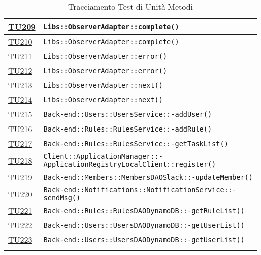 \begin{longtable}{|>{\centering}m{1cm}|m{12cm}<{\centering}|}
\hyperlink{TU209}{TU209} & \texttt{Libs::ObserverAdapter::complete()}\\ \hline

\hyperlink{TU210}{TU210} & \texttt{Libs::ObserverAdapter::complete()}\\ \hline

\hyperlink{TU211}{TU211} & \texttt{Libs::ObserverAdapter::error()}\\ \hline

\hyperlink{TU212}{TU212} & \texttt{Libs::ObserverAdapter::error()}\\ \hline

\hyperlink{TU213}{TU213} & \texttt{Libs::ObserverAdapter::next()}\\ \hline

\hyperlink{TU214}{TU214} & \texttt{Libs::ObserverAdapter::next()}\\ \hline

\hyperlink{TU215}{TU215} & \texttt{Back-end::Users::UsersService::-\linebreak addUser()}\\ \hline

\hyperlink{TU216}{TU216} & \texttt{Back-end::Rules::RulesService::-\linebreak addRule()}\\ \hline

\hyperlink{TU217}{TU217} & \texttt{Back-end::Rules::RulesService::-\linebreak getTaskList()}\\ \hline

\hyperlink{TU218}{TU218} & \texttt{Client::ApplicationManager::-\linebreak ApplicationRegistryLocalClient::register()}\\ \hline

\hyperlink{TU219}{TU219} & \texttt{Back-end::Members::MembersDAOSlack::-\linebreak updateMember()}\\ \hline

\hyperlink{TU220}{TU220} & \texttt{Back-end::Notifications::NotificationService::-\linebreak sendMsg()}\\ \hline

\hyperlink{TU221}{TU221} & \texttt{Back-end::Rules::RulesDAODynamoDB::-\linebreak getRuleList()}\\ \hline

\hyperlink{TU222}{TU222} & \texttt{Back-end::Users::UsersDAODynamoDB::-\linebreak getUserList()}\\ \hline

\hyperlink{TU223}{TU223} & \texttt{Back-end::Users::UsersDAODynamoDB::-\linebreak getUserList()}\\ \hline

\caption[Tracciamento Test di Unità-Metodi]{Tracciamento Test di Unità-Metodi}
\label{tabella:tu-met}
\end{longtable}
\clearpage
